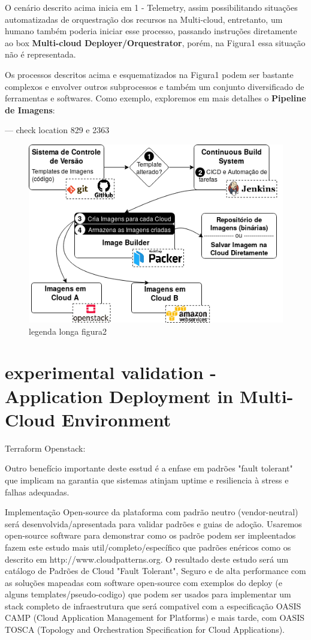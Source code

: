\documentclass[12pt]{article}
\begin{document}
	O cenário descrito acima inicia em 1 - Telemetry, assim possibilitando situações automatizadas de orquestração dos recursos na Multi-cloud, entretanto, um humano também poderia iniciar esse processo, passando instruções diretamente ao box \textbf{Multi-cloud Deployer/Orquestrator}, porém, na Figura1 essa situação não é representada.  
	
	Os processos descritos acima e esquematizados na Figura1 podem ser bastante complexos e envolver outros subprocessos e também um conjunto diversificado de ferramentas e softwares. Como exemplo, exploremos em mais detalhes o \textbf{Pipeline de Imagens}:
	
	--- check location 829 e 2363
	
		\begin{figure}[H]
			\centering
			\includegraphics[width=0.7\linewidth]{figuras/Figure2.png}
			\caption{legenda longa figura2}
			\label{fig:figure2}
		\end{figure}
	
	\section{experimental validation - Application Deployment in Multi-Cloud Environment}
	
	Terraform Openstack:
	

	
	
	
	
		
	Outro benefício importante deste esstud é a enfase em padrões "fault tolerant" que implicam na garantia que sistemas atinjam uptime e resiliencia à stress e falhas adequadas. 
	
	Implementação Open-source da plataforma com padrão neutro (vendor-neutral) será desenvolvida/apresentada para validar padrões e guias de adoção. Usaremos open-source software para demonstrar como os padrõe podem ser impleentados fazem este estudo mais util/completo/específico que padrões enéricos como os descrito em http://www.cloudpatterns.org.
	O resultado deste estudo será um catálogo de Padrões de Cloud "Fault Tolerant", Seguro e de alta performance com as soluções mapeadas com software open-source com exemplos do deploy (e alguns templates/pseudo-codigo) que podem ser usados para implementar um stack completo de infraestrutura que será compativel com a especificação OASIS CAMP (Cloud Application Management for Platforms) e mais tarde, com OASIS TOSCA (Topology and Orchestration Specification for Cloud Applications).
	
\end{document}
